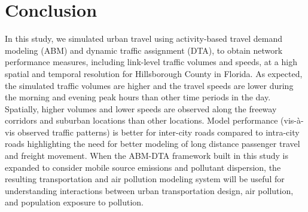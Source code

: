 \section{Conclusion}
In this study, we simulated urban travel using activity-based travel demand modeling (ABM) and dynamic traffic assignment (DTA), to obtain network performance measures, including link-level traffic volumes and speeds, at a high spatial and temporal resolution for Hillsborough County in Florida. As expected, the simulated traffic volumes are higher and the travel speeds are lower during the morning and evening peak hours than other time periods in the day. Spatially, higher volumes and lower speeds are observed along the freeway corridors and suburban locations than other locations. Model performance (vis-à-vis observed traffic patterns) is better for inter-city roads compared to intra-city roads highlighting the need for better modeling of long distance passenger travel and freight movement. When the ABM-DTA framework built in this study is expanded to consider mobile source emissions and pollutant dispersion, the resulting transportation and air pollution modeling system will be useful for understanding interactions between urban transportation design, air pollution, and population exposure to pollution.

